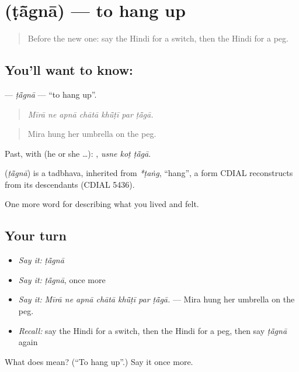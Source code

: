 \section[\texorpdfstring{\hi{टाँगना} (ṭā̃gnā)}{टाँगना (ṭā̃gnā)}]{ (ṭā̃gnā) — to hang up}

\label{lesson:HI-C518-tagna}



\begin{quote}
Before the new one: say the Hindi for a switch, then the Hindi for a peg.
\end{quote}

\subsection*{You'll want to know: }
\textbf{} — \emph{ṭā̃gnā} — \textquotedblleft{}to hang up\textquotedblright{}.

\begin{quote}
      
\end{quote}

\begin{quote}
\emph{Mīrā ne apnā chātā khū̃ṭī par ṭā̃gā.}
\end{quote}

\begin{quote}
Mira hung her umbrella on the peg.
\end{quote}

Past, with  (he or she …):   , \emph{usne koṭ ṭā̃gā}.

\begin{cousinweb}
\textbf{} (\emph{ṭā̃gnā}) is a tadbhava, inherited from \emph{*ṭaṅg}, \textquotedblleft{}hang\textquotedblright{}, a form CDIAL reconstructs from its descendants (CDIAL 5436).
\end{cousinweb}

\begin{grammarlens}[title={What you've built}]
One more word for describing what you lived and felt.
\end{grammarlens}

\subsection*{Your turn}
\begin{itemize}
\raggedright
  \item \emph{Say it:} \emph{ṭā̃gnā}
  \item \emph{Say it:} \emph{ṭā̃gnā}, once more
  \item \emph{Say it:} \emph{Mīrā ne apnā chātā khū̃ṭī par ṭā̃gā.} — Mira hung her umbrella on the peg.
  \item \emph{Recall:} say the Hindi for a switch, then the Hindi for a peg, then say \emph{ṭā̃gnā} again
\end{itemize}

\begin{tcolorbox}[breakable,colback=teal!4,colframe=teal!35!black,title={Before you move on}]
What does  mean? (\textquotedblleft{}To hang up\textquotedblright{}.) Say it once more.
\end{tcolorbox}
